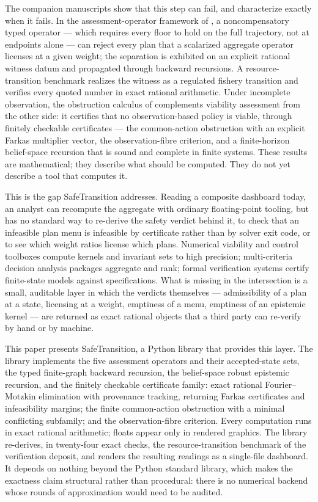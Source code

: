 \documentclass[3p,11pt]{elsarticle}
\begin{document}
The companion manuscripts show that this step can fail, and characterize
exactly when it fails. In the assessment-operator framework of \citet{Abaee2026a},
a noncompensatory typed operator --- which requires every floor to hold on
the full trajectory, not at endpoints alone --- can reject every plan that a
scalarized aggregate operator licenses at a given weight; the separation is
exhibited on an explicit rational witness datum and propagated through
backward recursions. A resource-transition benchmark realizes the witness as
a regulated fishery transition and verifies every quoted number in exact
rational arithmetic. Under incomplete observation, the obstruction calculus
of \citet{Abaee2026b} complements viability assessment from the other side: it
certifies that no observation-based policy is viable, through finitely
checkable certificates --- the common-action obstruction with an explicit
Farkas multiplier vector, the observation-fibre criterion, and a
finite-horizon belief-space recursion that is sound and complete in finite
systems. These results are mathematical; they describe what should be
computed. They do not yet describe a tool that computes it.

This is the gap SafeTransition addresses. Reading a composite dashboard
today, an analyst can recompute the aggregate with ordinary floating-point
tooling, but has no standard way to re-derive the safety verdict behind it,
to check that an infeasible plan menu is infeasible by certificate rather
than by solver exit code, or to see which weight ratios license which plans.
Numerical viability and control toolboxes compute kernels and invariant sets
to high precision; multi-criteria decision analysis packages aggregate and
rank; formal verification systems certify finite-state models against
specifications. What is missing in the intersection is a small, auditable
layer in which the verdicts themselves --- admissibility of a plan at a
state, licensing at a weight, emptiness of a menu, emptiness of an epistemic
kernel --- are returned as exact rational objects that a third party can
re-verify by hand or by machine.

This paper presents SafeTransition, a Python library that provides this
layer. The library implements the five assessment operators and their
accepted-state sets, the typed finite-graph backward recursion, the
belief-space robust epistemic recursion, and the finitely checkable
certificate family: exact rational Fourier--Motzkin elimination with
provenance tracking, returning Farkas certificates and infeasibility
margins; the finite common-action obstruction with a minimal conflicting
subfamily; and the observation-fibre criterion. Every computation runs in
exact rational arithmetic; floats appear only in rendered graphics. The
library re-derives, in twenty-four exact checks, the resource-transition
benchmark of the verification deposit, and renders the resulting readings as
a single-file dashboard. It depends on nothing beyond the Python standard
library, which makes the exactness claim structural rather than procedural:
there is no numerical backend whose rounds of approximation would need to be
audited.
\end{document}
